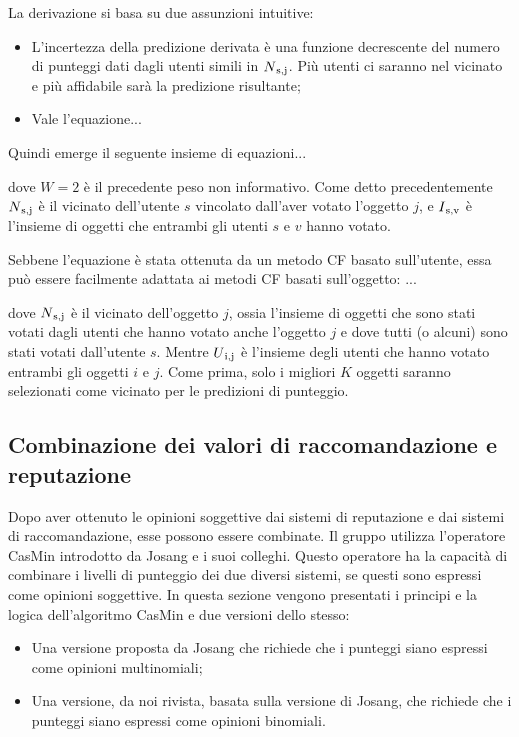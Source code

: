\documentclass{report}
\begin{document}
	La derivazione si basa su due assunzioni intuitive:
	
	\begin{itemize}
		\item
		L'incertezza della predizione derivata è una funzione decrescente del
		numero di punteggi dati dagli utenti simili in $N\textsubscript{s,j}$. Più utenti ci
		saranno nel vicinato e più affidabile sarà la predizione risultante;
		\item
		Vale l'equazione...
	\end{itemize}
	
	Quindi emerge il seguente insieme di equazioni...
	
	dove $W = 2$ è il precedente peso non informativo. Come detto
	precedentemente $N\textsubscript{s,j}$ è il vicinato dell'utente $s$ vincolato dall'aver
	votato l'oggetto $j$, e $I\textsubscript{s,v}$ è l'insieme di oggetti che entrambi gli
	utenti $s$ e $v$ hanno votato.
	
	Sebbene l'equazione è stata ottenuta da un metodo CF basato sull'utente,
	essa può essere facilmente adattata ai metodi CF basati sull'oggetto:
	...
	
	dove $N\textsubscript{s,j}$ è il vicinato dell'oggetto $j$, ossia l'insieme di oggetti che
	sono stati votati dagli utenti che hanno votato anche l'oggetto $j$ e dove
	tutti (o alcuni) sono stati votati dall'utente $s$. Mentre $U\textsubscript{i,j}$ è
	l'insieme degli utenti che hanno votato entrambi gli oggetti $i$ e $j$. Come
	prima, solo i migliori $K$ oggetti saranno selezionati come vicinato per
	le predizioni di punteggio.
	
	\hypertarget{header-n134}{%
		\subsection{Combinazione dei valori di raccomandazione e
			reputazione}\label{header-n134}}
	
	Dopo aver ottenuto le opinioni soggettive dai sistemi di reputazione e
	dai sistemi di raccomandazione, esse possono essere combinate. Il gruppo
	utilizza l'operatore CasMin introdotto da Josang e i suoi colleghi.
	Questo operatore ha la capacità di combinare i livelli di punteggio dei
	due diversi sistemi, se questi sono espressi come opinioni soggettive.
	In questa sezione vengono presentati i principi e la logica
	dell'algoritmo CasMin e due versioni dello stesso:
	
	\begin{itemize}
		\item
		Una versione proposta da Josang che richiede che i punteggi siano
		espressi come opinioni multinomiali;
		\item
		Una versione, da noi rivista, basata sulla versione di Josang, che
		richiede che i punteggi siano espressi come opinioni binomiali.
	\end{itemize}
	
\end{document}
